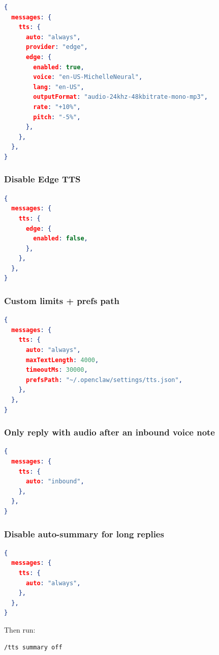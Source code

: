 \begin{lstlisting}[language=json]
{
  messages: {
    tts: {
      auto: "always",
      provider: "edge",
      edge: {
        enabled: true,
        voice: "en-US-MichelleNeural",
        lang: "en-US",
        outputFormat: "audio-24khz-48kbitrate-mono-mp3",
        rate: "+10%",
        pitch: "-5%",
      },
    },
  },
}
\end{lstlisting}


\subsubsection{Disable Edge TTS}


\begin{lstlisting}[language=json]
{
  messages: {
    tts: {
      edge: {
        enabled: false,
      },
    },
  },
}
\end{lstlisting}


\subsubsection{Custom limits + prefs path}


\begin{lstlisting}[language=json]
{
  messages: {
    tts: {
      auto: "always",
      maxTextLength: 4000,
      timeoutMs: 30000,
      prefsPath: "~/.openclaw/settings/tts.json",
    },
  },
}
\end{lstlisting}


\subsubsection{Only reply with audio after an inbound voice note}


\begin{lstlisting}[language=json]
{
  messages: {
    tts: {
      auto: "inbound",
    },
  },
}
\end{lstlisting}


\subsubsection{Disable auto-summary for long replies}


\begin{lstlisting}[language=json]
{
  messages: {
    tts: {
      auto: "always",
    },
  },
}
\end{lstlisting}


Then run:

\begin{lstlisting}
/tts summary off
\end{lstlisting}


